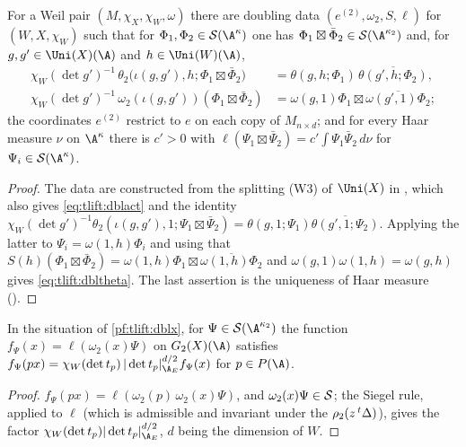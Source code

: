 \begin{proposition}[Doubling]\label{pf:tlift:dblx}
For a Weil pair $(M,\chi_X,\chi_W,\omega)$ there are doubling data $(e^{(2)},\omega_2,S,\ell)$ for
$(W,X,\chi_W)$ such that for $\Phi_1,\Phi_2\in\tliftS(\A^\kappa)$ one has $\Phi_1\boxtimes\bar\Phi_2\in\tliftS(\A^{\kappa_2})$
and, for $g,g'\in\Uni(X)(\A)$ and $h\in\Uni(W)(\A)$,
\begin{align}
  \chi_W(\det g')^{-1}\,\theta_2\bigl(\iota(g,g'),h;\Phi_1\boxtimes\bar\Phi_2\bigr)
    &=\theta(g,h;\Phi_1)\,\overline{\theta(g',h;\Phi_2)},\label{eq:tlift:dbltheta}\\
  \chi_W(\det g')^{-1}\,\omega_2(\iota(g,g'))(\Phi_1\boxtimes\bar\Phi_2)
    &=\omega(g,1)\Phi_1\boxtimes\overline{\omega(g',1)\Phi_2};\label{eq:tlift:dblact}
\end{align}
the coordinates $e^{(2)}$ restrict to $e$ on each copy of $M_{n\times d}$; and for every Haar measure $\nu$ on
$\A^\kappa$ there is $c'>0$ with $\ell(\Psi_1\boxtimes\bar\Psi_2)=c'\int\Psi_1\bar\Psi_2\,d\nu$ for
$\Psi_i\in\tliftS(\A^\kappa)$.
\end{proposition}

\begin{proof}
The data are constructed from the splitting (W3) of $\Uni(X)$ in ,
which also gives \eqref{eq:tlift:dblact} and the identity
$\chi_W(\det g')^{-1}\theta_2(\iota(g,g'),1;\Psi_1\boxtimes\bar\Psi_2)=\theta(g,1;\Psi_1)\overline{\theta(g',1;\Psi_2)}$.
Applying the latter to $\Psi_i=\omega(1,h)\Phi_i$ and using that $S(h)(\Phi_1\boxtimes\bar\Phi_2)=
\omega(1,h)\Phi_1\boxtimes\overline{\omega(1,h)\Phi_2}$ and $\omega(g,1)\omega(1,h)=\omega(g,h)$ gives
\eqref{eq:tlift:dbltheta}. The last assertion is the uniqueness of Haar measure
().
\end{proof}

\begin{lemma}\label{pf:tlift:law}
In the situation of \cref{pf:tlift:dblx}, for $\Psi\in\tliftS(\A^{\kappa_2})$ the function
$f_\Psi(x)=\ell(\omega_2(x)\Psi)$ on $G_2(X)(\A)$ satisfies
$f_\Psi(px)=\chi_W(\det t_p)\,|\det t_p|_{\tliftAE}^{d/2}f_\Psi(x)$ for $p\in P(\A)$.
\end{lemma}

\begin{proof}
$f_\Psi(px)=\ell(\omega_2(p)\,\omega_2(x)\Psi)$, and $\omega_2(x)\Psi\in\mathcal{S}$; the Siegel rule, applied to $\ell$
(which is admissible and invariant under the $\rho_2(z\,{}^t\Delta)$), gives the factor
$\chi_W(\det t_p)|\det t_p|_{\tliftAE}^{d/2}$, $d$ being the dimension of $W$.
\end{proof}

